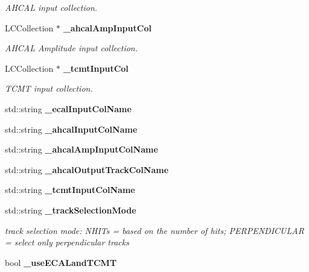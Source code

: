 \begin{DoxyCompactItemize}
\begin{DoxyCompactList}\small\item\em A\-H\-C\-A\-L input collection. \end{DoxyCompactList}\item 
L\-C\-Collection $\ast$ {\bf \-\_\-ahcal\-Amp\-Input\-Col}\label{classCALICE_1_1MipTrackFinder_a60d1306464699c01c609abc7f8edddaa}

\begin{DoxyCompactList}\small\item\em A\-H\-C\-A\-L Amplitude input collection. \end{DoxyCompactList}\item 
L\-C\-Collection $\ast$ {\bf \-\_\-tcmt\-Input\-Col}\label{classCALICE_1_1MipTrackFinder_a3e4410c59519f6a9ba69aa07983ebeb0}

\begin{DoxyCompactList}\small\item\em T\-C\-M\-T input collection. \end{DoxyCompactList}\item 
std\-::string {\bfseries \-\_\-ecal\-Input\-Col\-Name}\label{classCALICE_1_1MipTrackFinder_aede8ca5f1ff5926b465b427f1e4f9a97}

\item 
std\-::string {\bfseries \-\_\-ahcal\-Input\-Col\-Name}\label{classCALICE_1_1MipTrackFinder_ae71300eb7bcb4d10522c49cba491b995}

\item 
std\-::string {\bfseries \-\_\-ahcal\-Amp\-Input\-Col\-Name}\label{classCALICE_1_1MipTrackFinder_a2e88acac7e2cfa5be020b3fbe9448442}

\item 
std\-::string {\bfseries \-\_\-ahcal\-Output\-Track\-Col\-Name}\label{classCALICE_1_1MipTrackFinder_a514a9e8135b991d26fda0df6cb4e5740}

\item 
std\-::string {\bfseries \-\_\-tcmt\-Input\-Col\-Name}\label{classCALICE_1_1MipTrackFinder_a4f087086c49cb3721e512d68c1eac320}

\item 
std\-::string {\bf \-\_\-track\-Selection\-Mode}\label{classCALICE_1_1MipTrackFinder_a6e6e7284cd571e5c093b69ee1a253ae7}

\begin{DoxyCompactList}\small\item\em track selection mode\-: N\-H\-I\-Ts = based on the number of hits; P\-E\-R\-P\-E\-N\-D\-I\-C\-U\-L\-A\-R = select only perpendicular tracks \end{DoxyCompactList}\item 
bool {\bf \-\_\-use\-E\-C\-A\-Land\-T\-C\-M\-T}\label{classCALICE_1_1MipTrackFinder_ab0c70fcc6c54979eb0a24466fc667912}


\end{DoxyCompactItemize}
